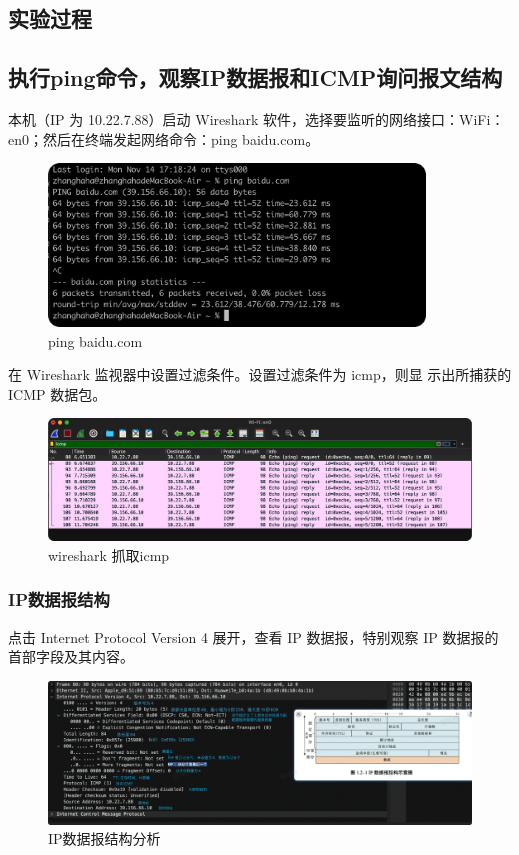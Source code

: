 \documentclass[a4paper,12pt]{report}
\begin{document}
\begin{spacing}{1.5}
\section{实验过程}
\subsection{执行ping命令，观察IP数据报和ICMP询问报文结构}
本机（IP 为 10.22.7.88）启动 Wireshark 软件，选择要监听的网络接口：WiFi：en0；然后在终端发起网络命令：ping baidu.com。
\begin{figure}[htb!]
  \centering
\includegraphics[width=10cm]{figure/pingbaidu.png}
\caption{ping baidu.com}
\label{pic1}
\end{figure}

在 Wireshark 监视器中设置过滤条件。设置过滤条件为 icmp，则显 示出所捕获的 ICMP 数据包。
\begin{figure}[htb!]
  \centering
\includegraphics[width=12cm]{figure/pingbaidu_wireshark.png}
\caption{wireshark 抓取icmp}
\label{pic2}
\end{figure}

\subsubsection{IP数据报结构}
点击 Internet Protocol Version 4 展开，查看 IP 数据报，特别观察 IP 数据报的首部字段及其内容。
\begin{figure}[htb!]
  \centering
\includegraphics[width=14cm]{figure/ipv4.png}
\caption{IP数据报结构分析}
\label{pic3}
\end{figure}



\end{spacing}
\end{document}
